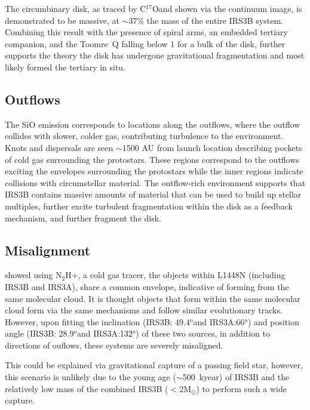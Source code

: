 \documentclass[preprint,12pt]{aastex62}
\newcommand{\nthp}{N$_2$H$+$}
\newcommand{\cso}{C$^{17}$O}
\renewcommand{\deg}{$^{o}$}
\newcommand{\ab}{$\sim$}
\newcommand{\solm}{M$_{\odot}$}
\begin{document}
The circumbinary disk, as traced by \cso\space and shown via the continuum image, is demonstrated to be massive, at \ab37\% the mass of the entire IRS3B system. Combining this result with the presence of spiral arms, an embedded tertiary companion, and the Toomre~Q falling below 1 for a bulk of the disk, further supports the theory the disk has undergone gravitational fragmentation and most likely formed the tertiary in situ. 

\subsection{Outflows}
The SiO emission corresponds to locations along the outflows, where the outflow collides with slower, colder gas, contributing turbulence to the environment. Knots and dispersals are seen \ab1500 AU from launch location describing pockets of cold gas surrounding the protostars. These regions correspond to the outflows exciting the envelopes surrounding the protostars while the inner regions indicate collisions with circumstellar material. The outflow-rich environment supports that IRS3B contains massive amounts of material that can be used to build up stellar multiples, further excite turbulent fragmentation within the disk as a feedback mechanism, and further fragment the disk. 

\subsection{Misalignment} \citet{2006ApJ...651..301V} showed using \nthp, a cold gas tracer, the objects within L1448N (including IRS3B and IRS3A), share a common envelope, indicative of forming from the same molecular cloud. It is thought objects that form within the same molecular cloud form via the same mechanisms and follow similar evolutionary tracks. However, upon fitting the inclination (IRS3B: 49.4\deg and IRS3A:66\deg) and position angle (IRS3B: 28.9\deg and IRS3A:132\deg) of these two sources, in addition to directions of ouflows, these systems are severely misaligned. 

This could be explained via gravitational capture of a passing field star, however, this scenario is unlikely due to the young age (\ab500~kyear) of IRS3B and the relatively low mass of the combined IRS3B ($<$2\solm) to perform such a wide capture.
\end{document}
